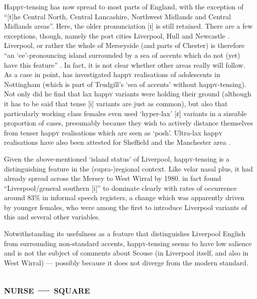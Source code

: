 Happ\textsc{y}-tensing has now spread to most parts of England, with the exception of ``[t]he Central North, Central Lancashire, Northwest Midlands and Central Midlands areas''.
Here, the older pronunciation [ɪ] is still retained.
There are a few exceptions, though, namely the port cities Liverpool, Hull and Newcastle \citep[cf.][62]{trudgill1999}.
Liverpool, or rather the whole of Merseyside (and parts of Chester) is therefore ``an `ee'-pronouncing island surrounded by a sea of accents which do not (yet) have this feature'' \citep[72]{trudgill1999}.
In fact, it is not clear whether other areas really will follow.
As a case in point, \textcite{flynn2010} has investigated happ\textsc{y} realisations of adolescents in Nottingham (which is part of Trudgill's `sea of accents' without happ\textsc{y}-tensing).
Not only did he find that lax happ\textsc{y} variants were holding their ground (although it has to be said that tense [i] variants are just as common), but also that particularly working class females even used `hyper-lax' [ɛ] variants in a sizeable proportion of cases, presumably because they wish to actively distance themselves from tenser happ\textsc{y} realisations which are seen as `posh'.
Ultra-lax happ\textsc{y} realisations have also been attested for Sheffield \parencite{stoddartetal1999} and the Manchester area \parencite{watts2006}.

Given the above-mentioned `island status' of Liverpool, happ\textsc{y}-tensing is a distinguishing feature in the (supra-)regional context.
Like velar nasal plus, it had already spread across the Mersey to West Wirral by 1980.
\textcite[97 and 99]{newbrook1999} in fact found ``Liverpool/general southern [i]'' to dominate clearly with rates of occurrence around 83\% in informal speech registers, a change which was apparently driven by younger females, who were among the first to introduce Liverpool variants of this and several other variables.

Notwithstanding its usefulness as a feature that distinguishes Liverpool English from surrounding non-standard accents, happ\textsc{y}-tensing seems to have low salience and is not the subject of comments about Scouse (in Liverpool itself, and also in West Wirral) --- possibly because it does not diverge from the modern standard.

		\subsection{\textsc{nurse} --- \textsc{square}}\label{sec.var.vow.nurse}

